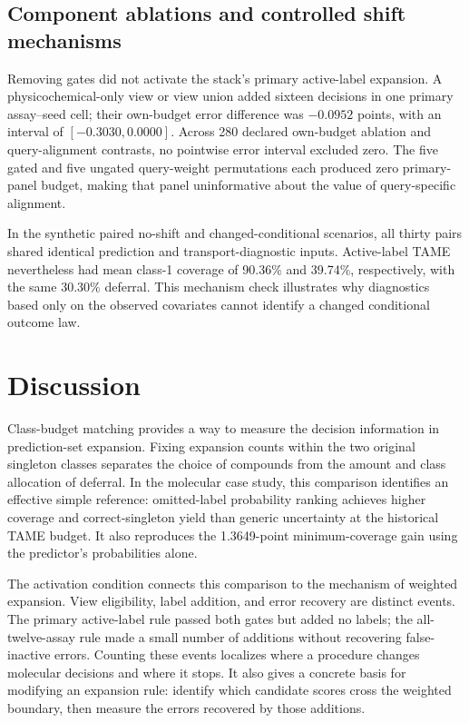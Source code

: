 \subsection{Component ablations and controlled shift mechanisms}
Removing gates did not activate the stack's primary active-label expansion. A physicochemical-only view or view union added sixteen decisions in one primary assay--seed cell; their own-budget error difference was $-0.0952$ points, with an interval of $[-0.3030,0.0000]$. Across 280 declared own-budget ablation and query-alignment contrasts, no pointwise error interval excluded zero. The five gated and five ungated query-weight permutations each produced zero primary-panel budget, making that panel uninformative about the value of query-specific alignment.

In the synthetic paired no-shift and changed-conditional scenarios, all thirty pairs shared identical prediction and transport-diagnostic inputs. Active-label TAME nevertheless had mean class-1 coverage of 90.36\% and 39.74\%, respectively, with the same 30.30\% deferral. This mechanism check illustrates why diagnostics based only on the observed covariates cannot identify a changed conditional outcome law.

\section{Discussion}
Class-budget matching provides a way to measure the decision information in prediction-set expansion. Fixing expansion counts within the two original singleton classes separates the choice of compounds from the amount and class allocation of deferral. In the molecular case study, this comparison identifies an effective simple reference: omitted-label probability ranking achieves higher coverage and correct-singleton yield than generic uncertainty at the historical TAME budget. It also reproduces the 1.3649-point minimum-coverage gain using the predictor's probabilities alone.

The activation condition connects this comparison to the mechanism of weighted expansion. View eligibility, label addition, and error recovery are distinct events. The primary active-label rule passed both gates but added no labels; the all-twelve-assay rule made a small number of additions without recovering false-inactive errors. Counting these events localizes where a procedure changes molecular decisions and where it stops. It also gives a concrete basis for modifying an expansion rule: identify which candidate scores cross the weighted boundary, then measure the errors recovered by those additions.


